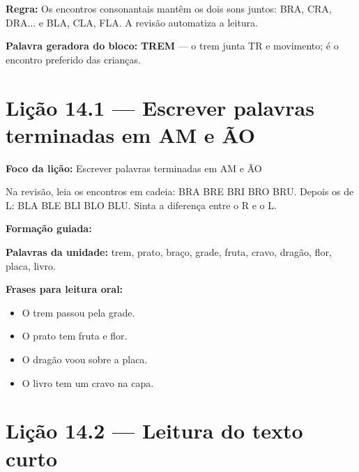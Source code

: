 \textbf{Regra:} Os encontros consonantais mantêm os dois sons juntos: BRA, CRA, DRA... e BLA, CLA, FLA. A revisão automatiza a leitura.

\textbf{Palavra geradora do bloco:} \textbf{TREM} --- o trem junta TR e movimento; é o encontro preferido das crianças.

\section{Lição 14.1 --- Escrever palavras terminadas em AM e ÃO}

\textbf{Foco da lição:} Escrever palavras terminadas em AM e ÃO


\begin{boquinha}
Na revisão, leia os encontros em cadeia: BRA BRE BRI BRO BRU. Depois os de L: BLA BLE BLI BLO BLU. Sinta a diferença entre o R e o L.
\end{boquinha}

\noindent\textbf{Formação guiada:}

\begin{center}
\end{center}

\noindent\textbf{Palavras da unidade:} trem, prato, braço, grade, fruta, cravo, dragão, flor, placa, livro.

\noindent\textbf{Frases para leitura oral:}
\begin{itemize}[leftmargin=1.6em]
  \item O trem passou pela grade.
  \item O prato tem fruta e flor.
  \item O dragão voou sobre a placa.
  \item O livro tem um cravo na capa.
\end{itemize}

\section{Lição 14.2 --- Leitura do texto curto}

